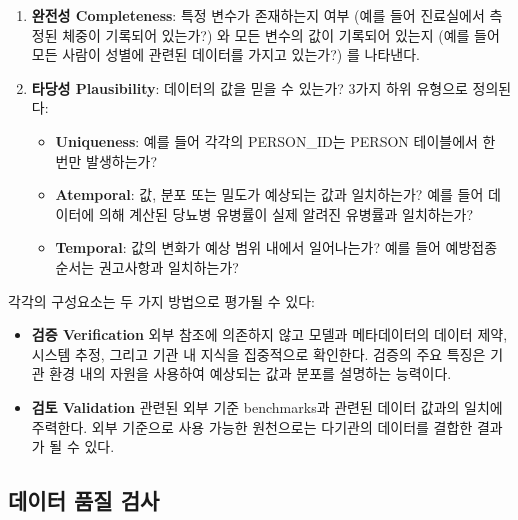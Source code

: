 \documentclass[10.5pt]{book}
\providecommand{\tightlist}{%
  \setlength{\itemsep}{0pt}\setlength{\parskip}{0pt}}
\theoremstyle{definition}
\theoremstyle{definition}
\theoremstyle{definition}
\theoremstyle{remark}
\begin{document}
\begin{enumerate}
\def\labelenumi{\arabic{enumi}.}
\setcounter{enumi}{1}
\tightlist
\item
  \textbf{완전성 Completeness}: 특정 변수가 존재하는지 여부 (예를 들어
  진료실에서 측정된 체중이 기록되어 있는가?) 와 모든 변수의 값이
  기록되어 있는지 (예를 들어 모든 사람이 성별에 관련된 데이터를 가지고
  있는가?) 를 나타낸다.
\item
  \textbf{타당성 Plausibility}: 데이터의 값을 믿을 수 있는가? 3가지 하위
  유형으로 정의된다:

  \begin{itemize}
  \tightlist
  \item
    \textbf{Uniqueness}: 예를 들어 각각의 PERSON\_ID는 PERSON 테이블에서
    한 번만 발생하는가?
  \item
    \textbf{Atemporal}: 값, 분포 또는 밀도가 예상되는 값과 일치하는가?
    예를 들어 데이터에 의해 계산된 당뇨병 유병률이 실제 알려진 유병률과
    일치하는가?
  \item
    \textbf{Temporal}: 값의 변화가 예상 범위 내에서 일어나는가? 예를
    들어 예방접종 순서는 권고사항과 일치하는가?
  \end{itemize}

   
\end{enumerate}

각각의 구성요소는 두 가지 방법으로 평가될 수 있다:

\begin{itemize}
\tightlist
\item
  \textbf{검증 Verification} 외부 참조에 의존하지 않고 모델과
  메타데이터의 데이터 제약, 시스템 추정, 그리고 기관 내 지식을
  집중적으로 확인한다. 검증의 주요 특징은 기관 환경 내의 자원을 사용하여
  예상되는 값과 분포를 설명하는 능력이다.
\item
  \textbf{검토 Validation} 관련된 외부 기준 benchmarks과 관련된 데이터
  값과의 일치에 주력한다. 외부 기준으로 사용 가능한 원천으로는 다기관의
  데이터를 결합한 결과가 될 수 있다.
\end{itemize}

 

\subsection{데이터 품질 검사}\label{--}

 
\end{document}
